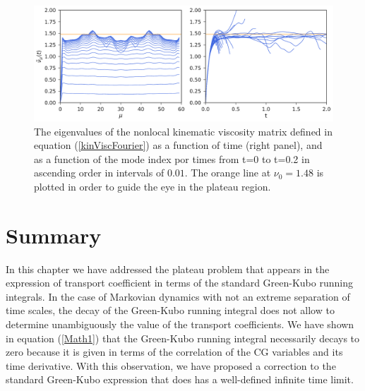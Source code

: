 \documentclass[b5paper,openright,10pt]{book}
\begin{document}
\begin{figure}[h!]
  \centering
\includegraphics[width=\linewidth]{KinVisctFourier-PBC}
\caption[The eigenvalues of the nonlocal kinematic viscosity matrix for an unconfined fluid]{The eigenvalues of the nonlocal kinematic viscosity matrix defined in equation (\ref{kinViscFourier}) as a function of time (right panel), and as a function of the mode index por times from t=0 to t=0.2 in ascending order in intervals of $0.01$. The orange line at $\nu_0=1.48$ is plotted in order to guide the eye in the plateau region.}
\label{fig:KinVisctFourier-PBC}
\end{figure}

\newpage
\section{Summary}
\label{Sec:SummaryChapPBC}
In this chapter we have addressed the plateau problem that appears in
the  expression of  transport  coefficient in  terms  of the  standard
Green-Kubo running integrals.  In the  case of Markovian dynamics with
not an extreme separation of time  scales, the decay of the Green-Kubo
running integral does  not allow to determine  unambiguously the value
of the  transport coefficients.  We  have shown in  equation  (\ref{Math1})
that  the  Green-Kubo  running  integral necessarily  decays  to  zero
because it  is given in terms  of the correlation of  the CG variables
and its  time derivative.  With  this observation, we have  proposed a
correction  to  the  standard  Green-Kubo  expression  that  does  has  a
well-defined infinite time limit. 
\end{document}
